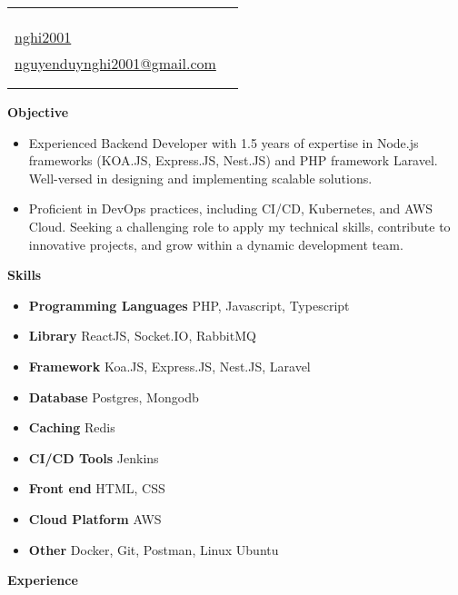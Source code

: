 \documentclass[letterpaper,12pt]{article}[leftmargin=*]
\makeatletter
\def \fullname {Nguyen Duy Nghi}
\def \subtitle {}
\def \phoneicon {\faPhone}
\def \phonetext {0799232407}
\def \emailicon {\faEnvelope}
\def \emaillink {mailto:nguyenduynghi2001@gmail.com}
\def \emailtext {nguyenduynghi2001@gmail.com}
\def \githubicon {\faGithub}
\def \githublink {https://github.com/nghi2001}
\def \githubtext {nghi2001}
\def \websiteicon {\faMapMarker}
\def \websitetext {Ho Chi Minh, Viet Nam}
\def \headertype {\singlecol} %
\def \entryspacing {-0pt}
\def \linkedin {\linkedinicon \hspace{3pt}\href{\linkedinlink}{\linkedintext}}
\def \phone {\phoneicon \hspace{3pt}{ \phonetext}}
\def \email {\emailicon \hspace{3pt}\href{\emaillink}{\emailtext}}
\def \github {\githubicon \hspace{3pt}\href{\githublink}{\githubtext}}
\def \website {\websiteicon \hspace{3pt}\href{\websitelink}{\websitetext}}
\renewcommand{\section}[2]{\vspace{5pt}
  \colorbox{secondary}{\color{white}\raggedbottom\normalsize\textbf{{#1}{\hspace{7pt}#2}}}
}
\newcommand{\resumeEntryStart}{\begin{itemize}[leftmargin=2.5mm]}
\newcommand{\resumeEntryEnd}{\end{itemize}\vspace{\entryspacing}}
\newcommand{\resumeItemListStart}{\begin{itemize}[leftmargin=4.5mm]}
\newcommand{\resumeItem}[1]{
  \item\small{
    {#1 \vspace{-2pt}}
  }
}
\newcommand{\resumeEntryS}[2]{
  \item[]\small{
    \textbf{\color{primary}#1 }{ #2 \vspace{-6pt}}
  }
}
\newcommand{\doublecol}[6]{
  \begin{tabularx}{\textwidth}{Xr}
    {
      \begin{tabular}[c]{l}
        \fontsize{35}{45}\selectfont{\color{primary}{{\textbf{\fullname}}}} \\
        {\textit{\subtitle}} %
      \end{tabular}
    } & {
      \begin{tabular}[c]{l@{\hspace{1.5em}}l}
        {\small#4} & {\small#1} \\
        {\small#5} & {\small#2} \\
        {\small#6} & {\small#3}
      \end{tabular}
    }
  \end{tabularx}
}
\newcommand{\singlecol}[6]{
  \begin{tabularx}{\textwidth}{Xr}
    {
      \begin{tabular}[b]{l}
        \fontsize{35}{45}\selectfont{\color{primary}{{\textbf{\fullname}}}} \\
        {\textit{\subtitle}} %
      \end{tabular}
    } & {
      \begin{tabular}[c]{l}
        {\small#1} \\
        {\small#2} \\
        {\small#3} \\
        {\small#4} \\
        {\small#5} \\
        {\small#6}
      \end{tabular}
    }
  \end{tabularx}
}
\makeatother
\begin{document}


\headertype{\website}{\phone}{\github}{\email}{\linkedin}{} %
\vspace{-10pt} %
\section{\faBars}{Objective}


\resumeEntryStart
    \resumeItemListStart
        \resumeItem{Experienced Backend Developer with 1.5 years of expertise in Node.js frameworks (KOA.JS, Express.JS, Nest.JS) and PHP framework Laravel. Well-versed in designing and implementing scalable solutions.}
        \resumeItem{Proficient in DevOps practices, including CI/CD, Kubernetes, and AWS Cloud. Seeking a challenging role to apply my technical skills, contribute to innovative projects, and grow within a dynamic development team.}
    \resumeEntryEnd


\resumeEntryEnd


\section{\faGears}{Skills}

 \resumeEntryStart
  \resumeEntryS{Programming Languages } {PHP, Javascript, Typescript}
  \resumeEntryS{Library } {ReactJS, Socket.IO, RabbitMQ}
  \resumeEntryS{Framework} {Koa.JS, Express.JS, Nest.JS, Laravel}
  \resumeEntryS{Database} {Postgres, Mongodb}
  \resumeEntryS{Caching} {Redis}
  \resumeEntryS{CI/CD Tools} {Jenkins}
  \resumeEntryS{Front end} {HTML, CSS}
  \resumeEntryS{Cloud Platform} {AWS}
  \resumeEntryS{Other} {Docker, Git, Postman, Linux Ubuntu}
 \resumeEntryEnd


\section{\faPieChart}{Experience}
\end{document}
